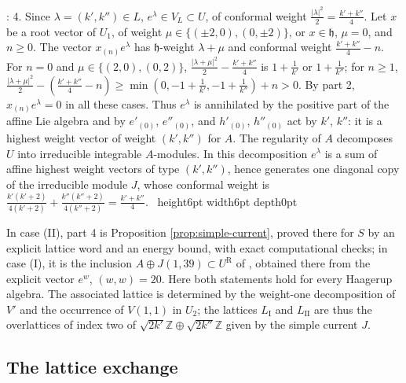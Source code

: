 \documentclass[leqno]{article}
\newcommand{\Z}{\ensuremath{\mathbb{Z}}}
\renewcommand{\geq}{\ensuremath{\geqslant}}
\newcommand{\qed}{\hfill \vrule height6pt  width6pt depth0pt}
\newenvironment{proof}[1][]{\noindent {\it Proof #1} : }{\hbox{~}\qed
\smallskip
}
\numberwithin{equation}{section}
\begin{document}
\begin{proof}
4. Since $\lambda = (k',k'') \in L$, $e^\lambda \in V_L \subset U$, of conformal weight $\frac{|\lambda|^2}2 = \frac{k'+k''}4$. Let $x$ be a root vector of $U_1$, of weight $\mu \in \{(\pm2,0),(0,\pm2)\}$, or $x \in \mathfrak h$, $\mu = 0$, and $n \geq 0$. The vector $x_{(n)}e^\lambda$ has $\mathfrak h$-weight $\lambda+\mu$ and conformal weight $\frac{k'+k''}4-n$. For $n = 0$ and $\mu \in \{(2,0),(0,2)\}$, $\frac{|\lambda+\mu|^2}2-\frac{k'+k''}4$ is $1+\frac1{k'}$ or $1+\frac1{k''}$; for $n \geq 1$, $\frac{|\lambda+\mu|^2}2-(\frac{k'+k''}4-n) \geq \min(0,-1+\frac1{k'},-1+\frac1{k''})+n > 0$. By part 2, $x_{(n)}e^\lambda = 0$ in all these cases. Thus $e^\lambda$ is annihilated by the positive part of the affine Lie algebra and by $e'_{(0)}$, $e''_{(0)}$, and $h'_{(0)}$, $h''_{(0)}$ act by $k'$, $k''$: it is a highest weight vector of weight $(k',k'')$ for $A$. The regularity of $A$ decomposes $U$ into irreducible integrable $A$-modules. In this decomposition $e^\lambda$ is a sum of affine highest weight vectors of type $(k',k'')$, hence generates one diagonal copy of the irreducible module $J$, whose conformal weight is $\frac{k'(k'+2)}{4(k'+2)}+\frac{k''(k''+2)}{4(k''+2)} = \frac{k'+k''}4$.
\end{proof}

In case (II), part 4 is Proposition \ref{prop:simple-current}, proved there for $S$ by an explicit lattice word and an energy bound, with exact computational checks; in case (I), it is the inclusion $A \oplus J(1,39) \subset U^{\mathrm R}$ of \cite[Proposition 7.1]{Rie26b}, obtained there from the explicit vector $e^w$, $(w,w) = 20$. Here both statements hold for every Haagerup algebra. The associated lattice is determined by the weight-one decomposition of $V'$ and the occurrence of $V(1,1)$ in $U_2$; the lattices $L_{\mathrm I}$ and $L_{\mathrm{II}}$ are thus the overlattices of index two of $\sqrt{2k'}\Z \oplus \sqrt{2k''}\Z$ given by the simple current $J$.

\subsection{The lattice exchange}
\end{document}
